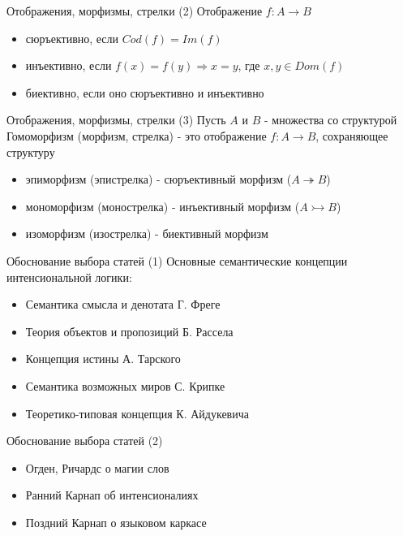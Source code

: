 \documentclass{beamer}
\begin{document}
\begin{frame}{Отображения, морфизмы, стрелки (2)}
Отображение $f : A \to B$
  \begin{itemize}
    \item сюръективно, если $Cod(f) = Im(f)$
    \item инъективно, если $f(x) = f(y) \Rightarrow x = y$, где $x, y \in Dom(f)$
    \item биективно, если оно сюръективно и инъективно
  \end{itemize}
\end{frame}

\begin{frame}{Отображения, морфизмы, стрелки (3)}
Пусть $A$ и $B$ - множества со структурой\\ \bigskip
Гомоморфизм (морфизм, стрелка) - это отображение $f : A \to B$, сохраняющее структуру\\
  \begin{itemize}
    \item эпиморфизм (эпистрелка) - сюръективный морфизм ($A \twoheadrightarrow B$)
    \item мономорфизм (монострелка) - инъективный морфизм ($A \rightarrowtail B$)
    \item изоморфизм (изострелка) - биективный морфизм 
  \end{itemize}
\end{frame}


\begin{frame}{Обоснование выбора статей (1)}
Основные семантические концепции интенсиональной логики:\\
  \begin{itemize}
    \item Семантика смысла и денотата Г. Фреге
    \item Теория объектов и пропозиций Б. Рассела
    \item Концепция истины А. Тарского
    \item Семантика возможных миров С. Крипке
    \item Теоретико-типовая концепция К. Айдукевича
  \end{itemize}
\end{frame}

\begin{frame}{Обоснование выбора статей (2)}
  \begin{itemize}
    \item Огден, Ричардс о магии слов
    \item Ранний Карнап об интенсионалиях
    \item Поздний Карнап о языковом каркасе
  \end{itemize}
\end{frame}
\end{document}
